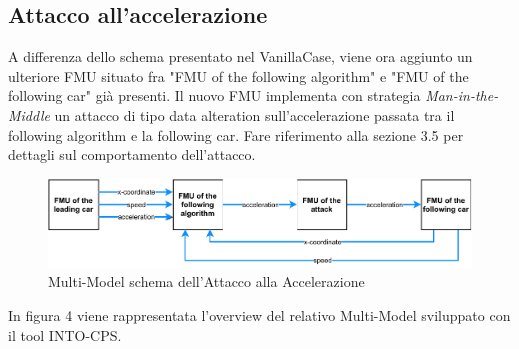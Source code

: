 \subsection{Attacco all'accelerazione}
A differenza dello schema presentato nel VanillaCase, viene ora aggiunto un ulteriore FMU situato fra "FMU of the following algorithm" e "FMU of the following car" già presenti. Il nuovo FMU implementa con strategia \textit{Man-in-the-Middle} un attacco di tipo data alteration sull'accelerazione passata tra il following algorithm e la following car. Fare riferimento alla sezione 3.5 per dettagli sul comportamento dell'attacco.
\begin{figure}[H]
	\centering
	\includegraphics{img/AccelAttackSchema.pdf}
	\caption{Multi-Model schema dell'Attacco alla Accelerazione}
\end{figure}

In figura 4 viene rappresentata l'overview del relativo Multi-Model sviluppato con il tool INTO-CPS. 

